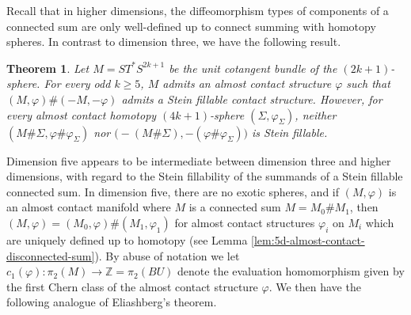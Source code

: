 \documentclass[12pt]{amsart}
\newcommand\Z{\mathbb{Z}}
\newcommand\acs{\varphi}  				%
\newtheorem{Theorem}{Theorem}[section]
\theoremstyle{remark}
\newcommand{\jbcomm}[1]{\begingroup\color{green}JB:~#1\endgroup}
\begin{document}
Recall that in higher dimensions, the diffeomorphism types of components of a connected 
sum are only
well-defined up to connect summing with homotopy spheres. In contrast
to dimension three, we have the following result.

\begin{Theorem}\label{thm:mainconnsum}
Let $M = ST^*S^{2k{+}1}$ be the unit cotangent bundle of the
$(2k{+}1)$-sphere.  For every odd $k \geq 5$, $M$ admits an almost
contact structure $\varphi$ such that $(M,\varphi) \# (-M,-\varphi)$
admits a Stein fillable contact structure.  However, for every
almost contact homotopy $(4k{+}1)$-sphere $(\Sigma, \acs_\Sigma)$,
neither $(M \# \Sigma, \varphi \# \varphi_{\Sigma})$ nor 
$\bigl(-(M \# \Sigma), -(\varphi \# \varphi_{\Sigma}) \bigr)$ is Stein fillable.
%
%
%
\end{Theorem}
%


Dimension five appears to be 
intermediate between dimension three and higher dimensions,
with regard to the Stein fillability of the summands of a Stein fillable
connected sum.
In dimension five, there are no exotic spheres, and 
if $(M, \acs)$ is an almost contact manifold where $M$ is a connected sum
$M = M_0 \# M_1$, then $(M, \acs) = (M_0, \acs) \# (M_1, \acs_1)$ for almost
contact structures $\acs_i$ on $M_i$ which are uniquely defined up to homotopy
(see Lemma \ref{lem:5d-almost-contact-disconnected-sum}).
By abuse of notation we let
$c_1(\varphi) \colon \pi_2(M) \to \Z = \pi_2(BU)$ denote the evaluation homomorphism given by the first Chern class of the almost contact structure $\varphi$. We then have the following
analogue of Eliashberg's theorem.
\end{document}
